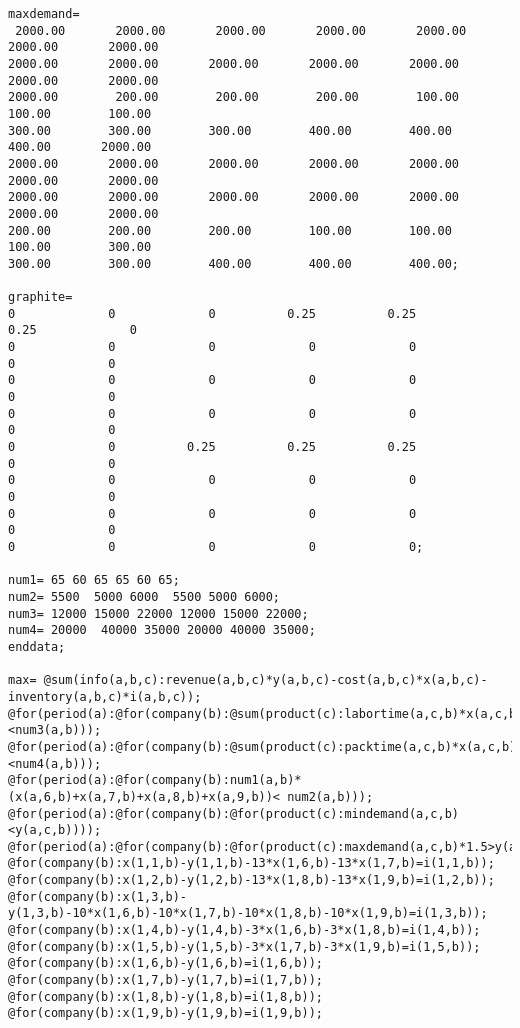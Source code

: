 \documentclass[12pt]{article}
\begin{document}
\begin{appendices}
\begin{lstlisting}
maxdemand=
 2000.00       2000.00       2000.00       2000.00       2000.00       2000.00       2000.00
2000.00       2000.00       2000.00       2000.00       2000.00       2000.00       2000.00
2000.00        200.00        200.00        200.00        100.00        100.00        100.00
300.00        300.00        300.00        400.00        400.00        400.00       2000.00
2000.00       2000.00       2000.00       2000.00       2000.00       2000.00       2000.00
2000.00       2000.00       2000.00       2000.00       2000.00       2000.00       2000.00
200.00        200.00        200.00        100.00        100.00        100.00        300.00
300.00        300.00        400.00        400.00        400.00;

graphite=
0             0             0          0.25          0.25          0.25             0
0             0             0             0             0             0             0
0             0             0             0             0             0             0
0             0             0             0             0             0             0
0             0          0.25          0.25          0.25             0             0
0             0             0             0             0             0             0
0             0             0             0             0             0             0
0             0             0             0             0;

num1= 65 60 65 65 60 65;
num2= 5500  5000 6000  5500 5000 6000;
num3= 12000 15000 22000 12000 15000 22000;
num4= 20000  40000 35000 20000 40000 35000;
enddata;

max= @sum(info(a,b,c):revenue(a,b,c)*y(a,b,c)-cost(a,b,c)*x(a,b,c)-inventory(a,b,c)*i(a,b,c));
@for(period(a):@for(company(b):@sum(product(c):labortime(a,c,b)*x(a,c,b))<num3(a,b)));
@for(period(a):@for(company(b):@sum(product(c):packtime(a,c,b)*x(a,c,b))<num4(a,b)));
@for(period(a):@for(company(b):num1(a,b)*(x(a,6,b)+x(a,7,b)+x(a,8,b)+x(a,9,b))< num2(a,b)));
@for(period(a):@for(company(b):@for(product(c):mindemand(a,c,b)<y(a,c,b))));
@for(period(a):@for(company(b):@for(product(c):maxdemand(a,c,b)*1.5>y(a,c,b))));
@for(company(b):x(1,1,b)-y(1,1,b)-13*x(1,6,b)-13*x(1,7,b)=i(1,1,b));
@for(company(b):x(1,2,b)-y(1,2,b)-13*x(1,8,b)-13*x(1,9,b)=i(1,2,b));
@for(company(b):x(1,3,b)-y(1,3,b)-10*x(1,6,b)-10*x(1,7,b)-10*x(1,8,b)-10*x(1,9,b)=i(1,3,b));
@for(company(b):x(1,4,b)-y(1,4,b)-3*x(1,6,b)-3*x(1,8,b)=i(1,4,b));
@for(company(b):x(1,5,b)-y(1,5,b)-3*x(1,7,b)-3*x(1,9,b)=i(1,5,b));
@for(company(b):x(1,6,b)-y(1,6,b)=i(1,6,b));
@for(company(b):x(1,7,b)-y(1,7,b)=i(1,7,b));
@for(company(b):x(1,8,b)-y(1,8,b)=i(1,8,b));
@for(company(b):x(1,9,b)-y(1,9,b)=i(1,9,b));


\end{lstlisting}
\end{appendices}
\end{document}
